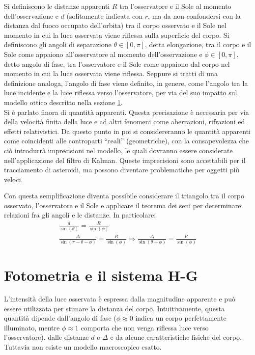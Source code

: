 \documentclass[12pt,a4paper,openright,twoside]{book}
\begin{document}
Si definiscono le distanze apparenti $R$ tra l'osservatore e il Sole al momento dell'osservazione e $d$ (solitamente indicata con $r$, ma da non confondersi con la distanza dal fuoco occupato dell'orbita) tra il corpo osservato e il Sole nel momento in cui la luce osservata viene riflessa sulla superficie del corpo. Si definiscono gli angoli di separazione $\theta\in[0,\pi]$, detta elongazione, tra il corpo e il Sole come appaiono all'osservatore al momento dell'osservazione e $\phi\in[0,\pi]$, detto angolo di fase, tra l'osservatore e il Sole come appaiono dal corpo nel momento in cui la luce osservata viene riflessa. Seppure si tratti di una definizione analoga, l'angolo di fase viene definito, in genere, come l'angolo tra la luce incidente e la luce riflessa verso l'osservatore, per via del suo impatto sul modello ottico descritto nella sezione \ref{sec:photometry}. \\

Si è parlato finora di quantità apparenti. Questa precisazione è necessaria per via della velocità finita della luce e ad altri fenomeni come aberrazioni, rifrazioni ed effetti relativistici. Da questo punto in poi si considereranno le quantità apparenti come coincidenti alle controparti ``reali'' (geometriche), con la consapevolezza che ciò introdurrà imprecisioni nel modello, le quali dovranno essere considerate nell'applicazione del filtro di Kalman. Queste imprecisioni sono accettabili per il tracciamento di asteroidi, ma possono diventare problematiche per oggetti più veloci.

Con questa semplificazione diventa possibile considerare il triangolo tra il corpo osservato, l'osservatore e il Sole e applicare il teorema dei seni per determinare relazioni fra gli angoli e le distanze. In particolare:
\begin{gather}
\frac{d}{\sin(\theta)}=\frac{R}{\sin(\phi)} \\
\frac{\Delta}{\sin(\pi-\theta-\phi)}=\frac{R}{\sin(\phi)}\Rightarrow\frac{\Delta}{\sin(\theta+\phi)}=\frac{R}{\sin(\phi)}
\end{gather}

\section{Fotometria e il sistema H-G}\label{sec:photometry}

L'intensità della luce osservata è espressa dalla magnitudine apparente e può essere utilizzata per stimare la distanza del corpo. Intuitivamente, questa quantità dipende dall'angolo di fase ($\phi\approx0$ indica un corpo perfettamente illuminato, mentre $\phi\approx1$ comporta che non venga riflessa luce verso l'osservatore), dalle distanze $d$ e $\Delta$ e da alcune caratteristiche fisiche del corpo. Tuttavia non esiste un modello macroscopico esatto.
\end{document}
